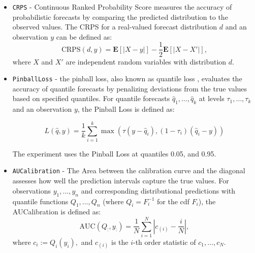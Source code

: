 \begin{itemize}
    
    \item \texttt{CRPS} - Continuous Ranked Probability Score \cite{matheson1976} measures the accuracy of probabilistic forecasts by comparing the predicted distribution to the observed values. The CRPS for a real-valued forecast distribution $d$ and an observation $y$ can be defined as:
    \[
    \text{CRPS}(d, y) = \mathbf{E} \left[ \left| X - y \right| \right] - \frac{1}{2} \mathbf{E} \left[ \left| X - X' \right| \right],
    \]
    where $X$ and $X'$ are independent random variables with distribution $d$.
    
    \item \texttt{PinballLoss} - the pinball loss, also known as quantile loss \cite{pinball_loss}, evaluates the accuracy of quantile forecasts by penalizing deviations from the true values based on specified quantiles.
    For quantile forecasts $\hat{q}_1, \dots, \hat{q}_k$ at levels $\tau_1, \dots, \tau_k$ and an observation $y$, the Pinball Loss is defined as:

    \begin{equation}
    L(\hat{q}, y) = \frac{1}{k} \sum_{i=1}^k \max \left(\tau (y - \hat{q}_i), (1 - \tau_i) (\hat{q}_i - y)\right)
    \end{equation}

    The experiment uses the Pinball Loss at quantiles 0.05, and 0.95.

    \item \texttt{AUCalibration} - The Area between the calibration curve and the diagonal assesses how well the prediction intervals capture the true values. For observations $y_1, \dots, y_n$ and corresponding distributional predictions with quantile functions $Q_1, \dots, Q_n$ (where $Q_i = F^{-1}_i$ for the cdf $F_i$), the AUCalibration is defined as:
    \begin{equation}
    \mbox{AUC} (Q_:, y_:) = \frac{1}{N} \sum_{i=1}^N \left| c_{(i)} - \frac{i}{N}\right|,
    \end{equation}
    where $c_i := Q_i(y_i),$ and $c_{(i)}$ is the $i$-th order statistic of $c_1, \dots, c_N$.


\end{itemize}
